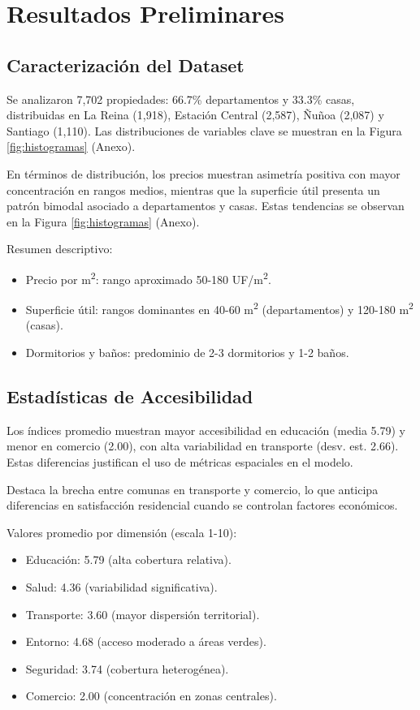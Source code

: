 \documentclass[11pt,letterpaper]{article}
\begin{document}
\section{Resultados Preliminares}

\subsection{Caracterización del Dataset}
Se analizaron 7,702 propiedades: 66.7\% departamentos y 33.3\% casas, distribuidas en La Reina (1,918), Estación Central (2,587), Ñuñoa (2,087) y Santiago (1,110). Las distribuciones de variables clave se muestran en la Figura \ref{fig:histogramas} (Anexo).

En términos de distribución, los precios muestran asimetría positiva con mayor concentración en rangos medios, mientras que la superficie útil presenta un patrón bimodal asociado a departamentos y casas. Estas tendencias se observan en la Figura \ref{fig:histogramas} (Anexo).

Resumen descriptivo:
\begin{itemize}
    \item Precio por m\textsuperscript{2}: rango aproximado 50-180 UF/m\textsuperscript{2}.
    \item Superficie útil: rangos dominantes en 40-60 m\textsuperscript{2} (departamentos) y 120-180 m\textsuperscript{2} (casas).
    \item Dormitorios y baños: predominio de 2-3 dormitorios y 1-2 baños.
\end{itemize}

\subsection{Estadísticas de Accesibilidad}
Los índices promedio muestran mayor accesibilidad en educación (media 5.79) y menor en comercio (2.00), con alta variabilidad en transporte (desv. est. 2.66). Estas diferencias justifican el uso de métricas espaciales en el modelo.

Destaca la brecha entre comunas en transporte y comercio, lo que anticipa diferencias en satisfacción residencial cuando se controlan factores económicos.

Valores promedio por dimensión (escala 1-10):
\begin{itemize}
    \item Educación: 5.79 (alta cobertura relativa).
    \item Salud: 4.36 (variabilidad significativa).
    \item Transporte: 3.60 (mayor dispersión territorial).
    \item Entorno: 4.68 (acceso moderado a áreas verdes).
    \item Seguridad: 3.74 (cobertura heterogénea).
    \item Comercio: 2.00 (concentración en zonas centrales).
\end{itemize}
\end{document}
